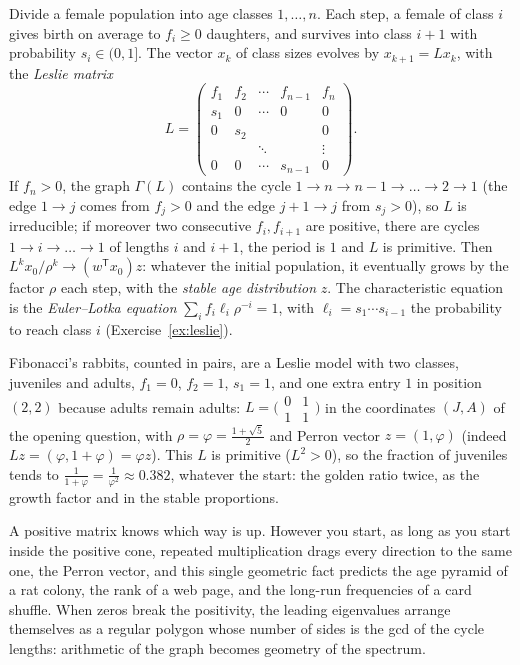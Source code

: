 \begin{example}\label{exa:leslie}
Divide a female population into age classes $1,\dots,n$. Each step, a female of class $i$ gives birth on average to $f_i\ge0$
daughters, and survives into class $i+1$ with probability $s_i\in(0,1]$. The vector $x_k$ of class sizes evolves by
$x_{k+1}=Lx_k$, with the \emph{Leslie matrix}
\[
L=\begin{pmatrix}f_1&f_2&\cdots&f_{n-1}&f_n\\s_1&0&\cdots&0&0\\0&s_2&&&0\\&&\ddots&&\vdots\\0&0&\cdots&s_{n-1}&0\end{pmatrix}.
\]
If $f_n>0$, the graph $\Gamma(L)$ contains the cycle $1\to n\to n-1\to\dots\to2\to1$ (the edge $1\to j$ comes from
$f_j>0$ and the edge $j+1\to j$ from $s_j>0$), so $L$ is irreducible; if moreover two consecutive $f_i,f_{i+1}$ are positive,
there are cycles $1\to i\to\dots\to1$ of lengths $i$ and $i+1$, the period is $1$ and $L$ is primitive. Then $L^kx_0/\rho^k\to(w^{\mathsf T}x_0)z$: whatever the initial population,
it eventually grows by the factor $\rho$ each step, with the \emph{stable age distribution} $z$. The characteristic equation
is the \emph{Euler--Lotka equation} $\sum_if_i\ell_i\rho^{-i}=1$, with $\ell_i=s_1\cdots s_{i-1}$ the probability to reach class
$i$ (Exercise~\ref{ex:leslie}).

Fibonacci's rabbits, counted in pairs, are a Leslie model with two classes, juveniles and adults, $f_1=0$,
$f_2=1$, $s_1=1$, and one extra entry $1$ in position $(2,2)$ because adults remain adults:
$L=\bigl(\begin{smallmatrix}0&1\\1&1\end{smallmatrix}\bigr)$ in the coordinates $(J,A)$ of the opening question, with
$\rho=\varphi=\frac{1+\sqrt5}2$ and Perron vector $z=(1,\varphi)$ (indeed $Lz=(\varphi,1+\varphi)=\varphi z$). This $L$ is
primitive ($L^2>0$), so the fraction of juveniles tends to $\frac1{1+\varphi}=\frac1{\varphi^2}\approx0.382$, whatever the
start: the golden ratio twice, as the growth factor and in the stable proportions.
\end{example}

\begin{beauty}
A positive matrix knows which way is up. However you start, as long as you start inside the positive cone, repeated
multiplication drags every direction to the same one, the Perron vector, and this single geometric fact predicts the age
pyramid of a rat colony, the rank of a web page, and the long-run frequencies of a card shuffle. When zeros break the
positivity, the leading eigenvalues arrange themselves as a regular polygon whose number of sides is the gcd of the cycle
lengths: arithmetic of the graph becomes geometry of the spectrum.
\end{beauty}

